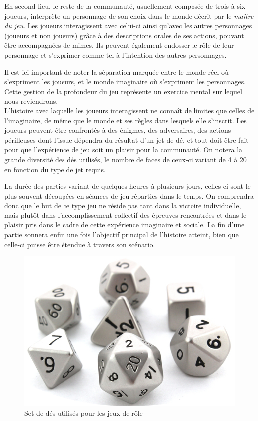 En second lieu, le reste de la communauté, usuellement composée de trois à six joueurs, interprète un personnage de son choix dans le monde décrit par le \textit{maître du jeu}. Les joueurs interagissent avec celui-ci ainsi qu'avec les autres personnages (joueurs et non joueurs) grâce à des descriptions orales de ses actions, pouvant être accompagnées de mimes. Ils peuvent également endosser le rôle de leur personnage et s'exprimer comme tel à l'intention des autres personnages.

Il est ici important de noter la séparation marquée entre le monde réel où s'expriment les joueurs, et le monde imaginaire où s'expriment les personnages. Cette gestion de la profondeur du jeu représente un exercice mental sur lequel nous reviendrons.\\


L'histoire avec laquelle les joueurs interagissent ne connaît de limites que celles de l'imaginaire, de même que le monde et ses règles dans lesquels elle s'inscrit. Les joueurs peuvent être confrontés à des énigmes, des adversaires, des actions périlleuses dont l'issue dépendra du résultat d'un jet de dé, et tout doit être fait pour que l'expérience de jeu soit un plaisir pour la communauté. On notera la grande diversité des dés utilisés, le nombre de faces de ceux-ci variant de 4 à 20 en fonction du type de jet requis.

La durée des parties variant de quelques heures à plusieurs jours, celles-ci sont le plus souvent découpées en séances de jeu réparties dans le temps. On comprendra donc que le but de ce type jeu ne réside pas tant dans la victoire individuelle, mais plutôt dans l'accomplissement collectif des épreuves rencontrées et dans le plaisir pris dans le cadre de cette expérience imaginaire et sociale. La fin d'une partie sonnera enfin une fois l'objectif principal de l'histoire atteint, bien que celle-ci puisse être étendue à travers son scénario.\\


\begin{figure}[h!]
    \centering
    \includegraphics[width=0.80\linewidth]{img/dice_set.png}
    \caption{Set de dés utilisés pour les jeux de rôle}
\end{figure}

